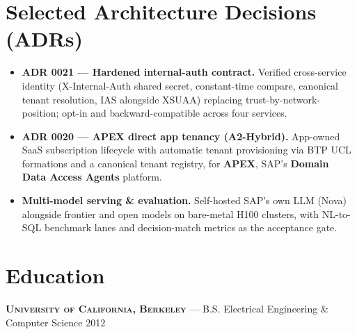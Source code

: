 \documentclass[11pt,letterpaper]{article}
\begin{document}
\section{Selected Architecture Decisions (ADRs)}
\begin{itemize}
  \item \textbf{ADR 0021 --- Hardened internal-auth contract.} Verified cross-service identity
  (X-Internal-Auth shared secret, constant-time compare, canonical tenant resolution, IAS alongside
  XSUAA) replacing trust-by-network-position; opt-in and backward-compatible across four services.
  \item \textbf{ADR 0020 --- APEX direct app tenancy (A2-Hybrid).} App-owned SaaS subscription
  lifecycle with automatic tenant provisioning via BTP UCL formations and a canonical tenant registry,
  for \textbf{APEX}, SAP's \textbf{Domain Data Access Agents} platform.
  \item \textbf{Multi-model serving \& evaluation.} Self-hosted SAP's own LLM (Nova) alongside
  frontier and open models on bare-metal H100 clusters, with NL-to-SQL benchmark lanes and
  decision-match metrics as the acceptance gate.
\end{itemize}

\section{Education}
{\scshape\bfseries University of California, Berkeley} --- B.S. Electrical Engineering \& Computer Science \hfill 2012
\end{document}
